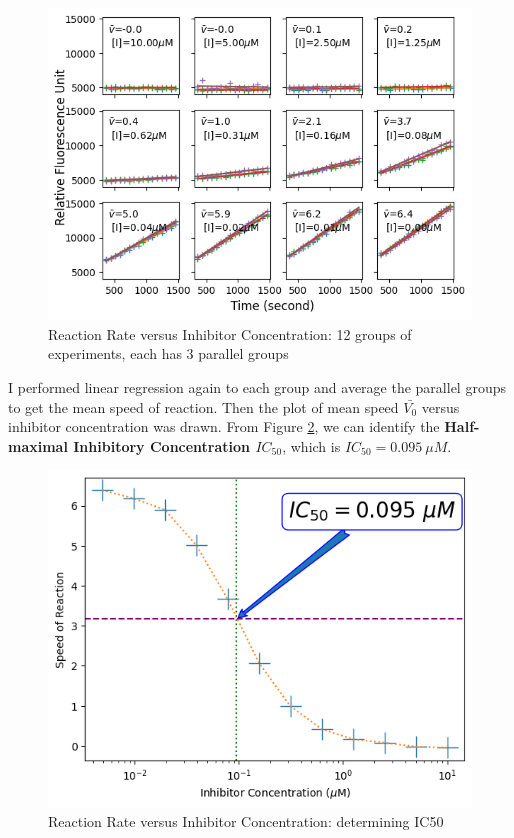 \documentclass{report}
\begin{document}
\begin{figure}
    \centering
    \includegraphics[width=1\linewidth]{../Figures/inhibitor1.png}
    \caption{Reaction Rate versus Inhibitor Concentration: 12 groups of experiments, each has 3
    parallel groups}
    \label{Reaction Rate versus Inhibitor Concentration: 12 groups of experiments, each has 3
    parallel groups}
\end{figure}

I performed linear regression again to each group and average the parallel groups to get the mean speed of reaction.
Then the plot of mean speed $\bar{V_0}$ versus inhibitor concentration was drawn.
From Figure \ref{Reaction Rate versus Inhibitor Concentration: determining IC50}, we can identify the \textbf{Half-maximal Inhibitory Concentration $IC_{50}$}, which is $IC_{50}=0.095\ \mu M$.

\begin{figure}
    \centering
    \includegraphics[width=1\linewidth]{../Figures/inhibitor2.png}
    \caption{Reaction Rate versus Inhibitor Concentration: determining IC50}
    \label{Reaction Rate versus Inhibitor Concentration: determining IC50}
\end{figure}





\end{document}
